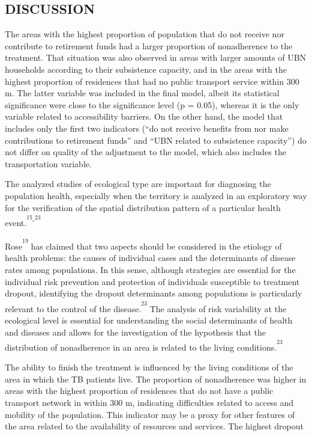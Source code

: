 \begin{multicols}{2}
\section*{DISCUSSION}
\par{}The areas with the highest proportion of population that do not receive nor contribute to retirement funds had a larger proportion of nonadherence to the treatment.\allowbreak{} That situation was also observed in areas with larger amounts of UBN households according to their subsistence capacity,\allowbreak{} and in the areas with the highest proportion of residences that had no public transport service within 300 m.\allowbreak{} The latter variable was included in the final model,\allowbreak{} albeit its statistical significance were close to the significance level (\allowbreak{}p = 0.\allowbreak{}05)\allowbreak{},\allowbreak{} whereas it is the only variable related to accessibility barriers.\allowbreak{} On the other hand,\allowbreak{} the model that includes only the first two indicators (\allowbreak{}“do not receive benefits from nor make contributions to retirement funds” and “UBN related to subsistence capacity”)\allowbreak{} do not differ on quality of the adjustment to the model,\allowbreak{} which also includes the transportation variable.\allowbreak{}\par{}The analyzed studies of ecological type are important for diagnosing the population health,\allowbreak{} especially when the territory is analyzed in an exploratory way for the verification of the spatial distribution pattern of a particular health event.\allowbreak{}\textsuperscript{\textsuperscript{15}}\textsuperscript{-\allowbreak{}}\textsuperscript{\textsuperscript{23}}\par{}Rose\textsuperscript{\textsuperscript{19}} has claimed that two aspects should be considered in the etiology of health problems:\allowbreak{} the causes of individual cases and the determinants of disease rates among populations.\allowbreak{} In this sense,\allowbreak{} although strategies are essential for the individual risk prevention and protection of individuals susceptible to treatment dropout,\allowbreak{} identifying the dropout determinants among populations is particularly relevant to the control of the disease.\allowbreak{}\textsuperscript{\textsuperscript{23}} The analysis of risk variability at the ecological level is essential for understanding the social determinants of health and diseases and allows for the investigation of the hypothesis that the distribution of nonadherence in an area is related to the living conditions.\allowbreak{}\textsuperscript{\textsuperscript{23}}\par{}The ability to finish the treatment is influenced by the living conditions of the area in which the TB patients live.\allowbreak{} The proportion of nonadherence was higher in areas with the highest proportion of residences that do not have a public transport network in within 300 m,\allowbreak{} indicating difficulties related to access and mobility of the population.\allowbreak{} This indicator may be a proxy for other features of the area related to the availability of resources and services.\allowbreak{} The highest dropout 
\end{multicols}

